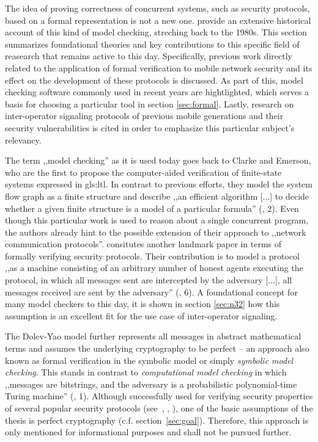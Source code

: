 The idea of proving correctness of concurrent systems, such as security protocols, based on a formal representation is not a new one.
\cite{basin2018model} provide an extensive historical account of this kind of model checking, streching back to the 1980s.
This section summarizes foundational theories and key contributions to this specific field of reasearch that remains active to this day.
Specifically, previous work directly related to the application of formal verification to mobile network security and its effect on the development of these protocols is discussed.
As part of this, model checking software commonly used in recent years are hightlighted, which serves a basis for choosing a particular tool in section \ref{sec:formal}.
Lastly, research on inter-operator signaling protocols of previous mobile generations and their security vulnerabilities is cited in order to emphasize this particular subject's relevancy.

The term ,,model checking'' as it is used today goes back to Clarke and Emerson, who are the first to propose the computer-aided verification of finite-state systems expressed in \gls{gls:ltl}.
In contrast to previous efforts, they model the system flow graph as a finite structure and describe ,,an efficient algorithm [...] to decide whether a given finite structure is a model of a particular formula'' (\cite{clarke1981design}, 2).
Even though this particular work is used to reason about a single concurrent program, the authors already hint to the possible extension of their approach to ,,network communication protocols''.
\cite{dolev1983security} consitutes another landmark paper in terms of formally verifying security protocols.
Their contribution is to model a protocol ,,as a machine consisting of an arbitrary number of honest agents executing the protocol, in which all messages sent are intercepted by the adversary [...], all messages received are sent by the adversary'' (\cite{basin2018model}, 6).
A foundational concept for many model checkers to this day, it is shown in section \ref{sec:n32} how this assumption is an excellent fit for the use case of inter-operator signaling.

The Dolev-Yao model further represents all messages in abstract mathematical terms and assumes the underlying cryptography to be perfect -- an approach also known as formal verification in the symbolic model or simply \textit{symbolic model checking}.
This stands in contrast to \textit{computational model checking} in which ,,messages are bitstrings, and the adversary is a probabilistic polynomial-time Turing machine'' (\cite{blanchet2008computationally}, 1).
Although successfully used for verifying security properties of several popular security protocols (see~\cite{BlanchetJaggardScedrovTsayAsiaCCS08}, \cite{CadeBlanchetJoWUA13}, \cite{LippBlanchetBhargavanEuroSP19}), one of the basic assumptions of the thesis is perfect cryptography (c.f. section~\ref{sec:goal}).
Therefore, this approach is only mentioned for informational purposes and shall not be pursued further.

